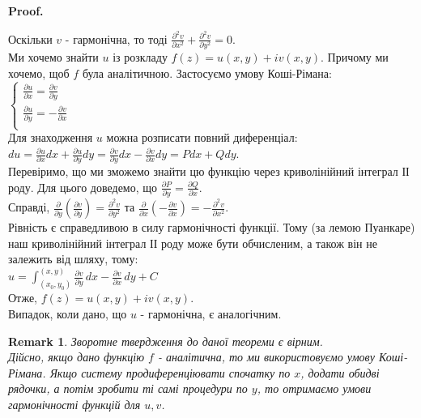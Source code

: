 \documentclass[a4paper, 10pt]{article}
\makeatletter
\def\qed{$\blacksquare$}
\theoremstyle{theoremdd}
\theoremstyle{theoremdd}
\theoremstyle{theoremdd}
\theoremstyle{theoremdd}
\theoremstyle{theoremdd}
\theoremstyle{theoremdd}
\newtheorem{remark}[theorem]{Remark}
\theoremstyle{theoremdd}
\theoremstyle{theoremdd}
\renewenvironment{proof}[1][Proof.\\]{\par
\pushQED{\hfill \qed}%
\normalfont \topsep6\p@\@plus6\p@\relax
\trivlist
\item\relax
{\bfseries
#1\@addpunct{.}}\hspace\labelsep\ignorespaces
}{%
\popQED\endtrivlist\@endpefalse
}
\makeatother
\begin{document}
\begin{proof}
Оскільки $v$ - гармонічна, то тоді $\displaystyle\frac{\partial^2 v}{\partial x^2} + \frac{\partial^2 v}{\partial y^2} = 0$.\\
Ми хочемо знайти $u$ із розкладу $f(z) = u(x,y) + iv(x,y)$. Причому ми хочемо, щоб $f$ була аналітичною. Застосуємо умову Коші-Рімана:\\
	$
	\begin{cases}
		\displaystyle\frac{\partial u}{\partial x} = \frac{\partial v}{\partial y}\\
		\displaystyle\frac{\partial u}{\partial y} = -\frac{\partial v}{\partial x}\\
	\end{cases}
	$\\
	Для знаходження $u$ можна розписати повний диференціал:\\
	$\displaystyle du = \frac{\partial u}{\partial x}dx + \frac{\partial u}{\partial y}dy = \frac{\partial v}{\partial y}dx -\frac{\partial v}{\partial x}dy = Pdx+Qdy$.\\
	Перевіримо, що ми зможемо знайти цю функцію через криволінійний інтеграл ІІ роду. Для цього доведемо, що	$\displaystyle \frac{\partial P}{\partial y} = \frac{\partial Q}{\partial x}$. \\
	Справді, $\displaystyle \frac{\partial}{\partial y}\left( \frac{\partial v}{\partial y} \right) = \frac{\partial^2 v}{\partial y^2}$ та $\displaystyle \frac{\partial}{\partial x}\left( -\frac{\partial v}{\partial x} \right) = -\frac{\partial^2 v}{\partial x^2}$.\\
	Рівність є справедливою в силу гармонічності функції. Тому (за лемою Пуанкаре) наш криволінійний інтеграл ІІ роду може бути обчисленим, а також він не залежить від шляху, тому:\\
	$\displaystyle u = \int_{(x_0, y_0)}^{(x,y)} \frac{\partial v}{\partial y}\,dx -\frac{\partial v}{\partial x}\,dy + C$\\
	Отже, $f(z) = u(x,y) + iv(x,y)$.\\
	Випадок, коли дано, що $u$ - гармонічна, є аналогічним.
\end{proof}
	
\begin{remark}
Зворотне твердження до даної теореми є вірним.
\bigskip \\
Дійсно, якщо дано функцію $f$ - аналітична, то ми використовуємо умову Коші-Рімана. Якщо систему продиференціювати спочатку по $x$, додати обидві рядочки, а потім зробити ті самі процедури по $y$, то отримаємо умови гармонічності функцій для $u,v$.
\end{remark}
\end{document}
